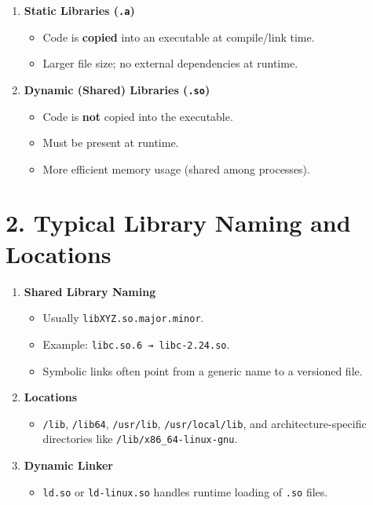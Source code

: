 \documentclass[12pt,a4paper]{report}
\begin{document}
\begin{enumerate}
    \item \textbf{Static Libraries (\texttt{.a})}
    \begin{itemize}
        \item Code is \textbf{copied} into an executable at compile/link time.
        \item Larger file size; no external dependencies at runtime.
    \end{itemize}

    \item \textbf{Dynamic (Shared) Libraries (\texttt{.so})}
    \begin{itemize}
        \item Code is \textbf{not} copied into the executable.
        \item Must be present at runtime.
        \item More efficient memory usage (shared among processes).
    \end{itemize}
\end{enumerate}

\section*{2. Typical Library Naming and Locations}

\begin{enumerate}
    \item \textbf{Shared Library Naming}
    \begin{itemize}
        \item Usually \texttt{libXYZ.so.major.minor}.
        \item Example: \texttt{libc.so.6 → libc-2.24.so}.
        \item Symbolic links often point from a generic name to a versioned file.
    \end{itemize}

    \item \textbf{Locations}
    \begin{itemize}
        \item \texttt{/lib}, \texttt{/lib64}, \texttt{/usr/lib}, \texttt{/usr/local/lib}, and architecture-specific directories like \texttt{/lib/x86\_64-linux-gnu}.
    \end{itemize}

    \item \textbf{Dynamic Linker}
    \begin{itemize}
        \item \texttt{ld.so} or \texttt{ld-linux.so} handles runtime loading of \texttt{.so} files.
    \end{itemize}
\end{enumerate}
\end{document}
